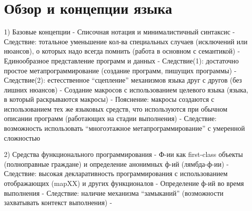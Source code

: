 \section{Обзор и концепции языка}\label{common-lisp:introduction:review}
1) Базовые концепции
 - Списочная нотация и минималистичный синтаксис
   - Следствие: тотальное уменьшение кол-ва специальных случаев (исключений или нюансов), о которых надо всегда помнить (работа в основном с семантикой)
 - Единообразное представление программ и данных
   - Следствие(1): достаточно простое метапрограммирование (создание программ, пишущих программы)
   - Следствие(2): естесственное ``сцепление'' механизмов языка друг с другов (без лишних нюансов)
 - Создание макросов с использованием целевого языка (языка, в который раскрываются макросы)
   - Пояснение: макросы создаются с использованием тех же языковых средств, что используются при обычном описании программ (работающих на стадии выполнения)
   - Следствие: возможность использовать ``многоэтажное метапрограммирование'' с умеренной сложностью

2) Средства функционального программирования
 - Ф-ии как first-class объекты (полноправные граждане) и определение анонимных ф-ий (лямбда-ф-ии)
   - Следствие: высокая декларативность программирования с использованием отображающих (mapXX) и других функционалов
 - Определение ф-ий во время выполнения
   - Следствие: наличие механизма ``замыканий'' (возможности захватывать контекст выполнения)
 - 

 
